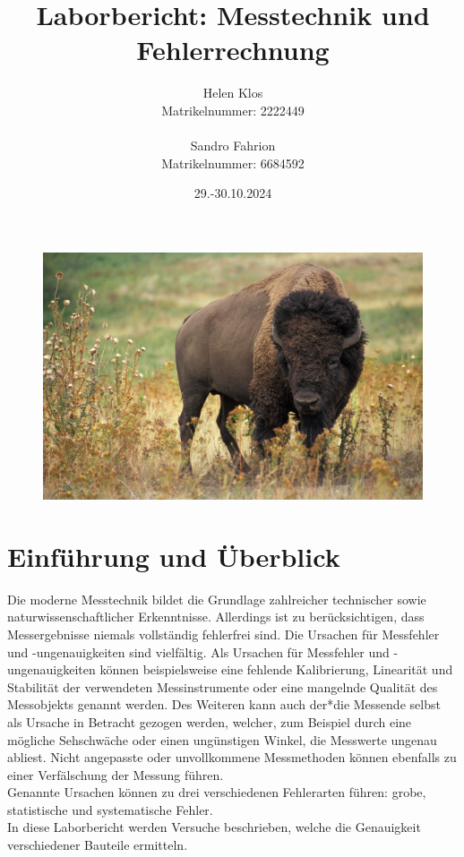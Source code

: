 \documentclass[a4paper,12pt]{article}
\title{Laborbericht: Messtechnik und Fehlerrechnung}
\author{Helen Klos \\Matrikelnummer: 2222449 \\ \\Sandro Fahrion \\Matrikelnummer: 6684592}
\date{29.-30.10.2024}
\begin{document}
\maketitle

\begin{figure}[H]
    \centering
    \includegraphics[width=1.0\textwidth]{../Quellen/Labor2/Titelbild.jpg}
\end{figure}
\newpage
\tableofcontents
\newpage

\section{Einführung und Überblick}
Die moderne Messtechnik bildet die Grundlage zahlreicher technischer sowie naturwissenschaftlicher Erkenntnisse. Allerdings ist zu berücksichtigen, dass Messergebnisse niemals vollständig fehlerfrei sind. Die Ursachen für Messfehler und -ungenauigkeiten sind vielfältig. Als Ursachen für Messfehler und -ungenauigkeiten können beispielsweise eine fehlende Kalibrierung, Linearität und Stabilität der verwendeten Messinstrumente oder eine mangelnde Qualität des Messobjekts genannt werden. Des Weiteren kann auch der*die Messende selbst als Ursache in Betracht gezogen werden, welcher, zum Beispiel durch eine mögliche Sehschwäche oder einen ungünstigen Winkel, die Messwerte ungenau abliest. Nicht angepasste oder unvollkommene Messmethoden können ebenfalls zu einer Verfälschung der Messung führen.\\
Genannte Ursachen können zu drei verschiedenen Fehlerarten führen: grobe, statistische und systematische Fehler. \\

\noindent In diese Laborbericht werden Versuche beschrieben, welche die Genauigkeit verschiedener Bauteile ermitteln.
\end{document}
